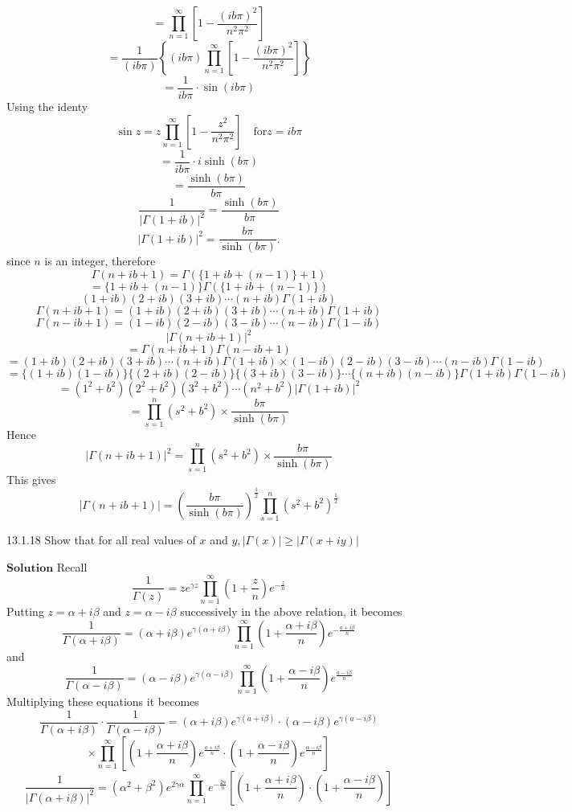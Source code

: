 \documentclass{article}
\begin{document}
\begin{flushleft}
$$
=\prod_{n=1}^{\infty}\left[1-\frac{(i b \pi)^{2}}{n^{2} \pi^{2}}\right]
$$
$$
=\frac{1}{(i b \pi)}\left\{(i b \pi) \prod_{n=1}^{\infty}\left[1-\frac{(i b \pi)^{2}}{n^{2} \pi^{2}}\right]\right\}
$$
$$
=\frac{1}{i b \pi} \cdot \sin (i b \pi)
$$
Using the identy
$$
\sin z=z \prod_{n=1}^{\infty}\left[1-\frac{z^{2}}{n^{2} \pi^{2}}\right] \quad \text{for} z=ib\pi
$$
$$=\frac{1}{i b \pi} \cdot i \sinh (b \pi)$$
$$=\frac{\sinh (b \pi)}{b \pi}$$
$$\frac{1}{|\Gamma(1+i b)|^{2}}=\frac{\sinh (b \pi)}{b \pi}$$
$$|\Gamma(1+i b)|^{2}=\frac{b \pi}{\sinh (b \pi)} .$$
since $n$ is an integer, therefore
$$\Gamma(n+i b+1)=\Gamma(\{1+i b+(n-1)\}+1)$$
$$=\{1+i b+(n-1)\} \Gamma(\{1+i b+(n-1)\})$$
$$
(1+i b)(2+i b)(3+i b) \cdots(n+i b) \Gamma(1+i b)
$$
$$
\Gamma(n+i b+1)=(1+i b)(2+i b)(3+i b) \cdots(n+i b) \Gamma(1+i b)
$$
$$
\Gamma(n-i b+1)=(1-i b)(2-i b)(3-i b) \cdots(n-i b) \Gamma(1-i b)
$$
$$|\Gamma(n+i b+1)|^{2}$$
$$=\Gamma(n+i b+1) \Gamma(n-i b+1)$$
$$=(1+i b)(2+i b)(3+i b) \cdots(n+i b) \Gamma(1+i b) \times(1-i b)(2-i b)(3-i b) \cdots(n-i b) \Gamma(1-i b)$$
$$=\{(1+i b)(1-i b)\}\{(2+i b)(2-i b)\}\{(3+i b)(3-i b)\} \cdots\{(n+i b)(n-i b)\} \Gamma(1+i b) \Gamma(1-i b)$$
$$=\left(1^{2}+b^{2}\right)\left(2^{2}+b^{2}\right)\left(3^{2}+b^{2}\right) \cdots\left(n^{2}+b^{2}\right)|\Gamma(1+i b)|^{2}$$
$$
=\prod_{s=1}^{n}\left(s^{2}+b^{2}\right) \times \frac{b \pi}{\sinh (b \pi)}
$$
Hence 
$$|\Gamma(n+i b+1)|^{2}=\prod_{s=1}^{n}\left(s^{2}+b^{2}\right) \times \frac{b \pi}{\sinh (b \pi)}$$
This gives 
$$|\Gamma(n+i b+1)|=\left(\frac{b \pi}{\sinh (b \pi)}\right)^{\frac{1}{2}} \prod_{s=1}^{n}\left(s^{2}+b^{2}\right)^{\frac{1}{2}} $$



\begin{mybox}{13.1.18}
Show that for all real values of $x$ and $y,|\Gamma(x)| \geq|\Gamma(x+i y)|$
\end{mybox}


$\boxed{\textbf{Solution}}$ Recall 
$$
\frac{1}{\Gamma(z)}=z e^{\gamma z} \prod_{n=1}^{\infty}\left(1+\frac{z}{n}\right) e^{-\frac{z}{n}}
$$
Putting $z=\alpha+i \beta$ and $z=\alpha-i \beta$ successively in the above relation, it becomes
$$
\frac{1}{\Gamma(\alpha+i \beta)}=(\alpha+i \beta) e^{\gamma(\alpha+i \beta)} \prod_{n=1}^{\infty}\left(1+\frac{\alpha+i \beta}{n}\right) e^{-\frac{a+i \beta}{n}}
$$
and 
$$
\frac{1}{\Gamma(\alpha-i \beta)}=(\alpha-i \beta) e^{\gamma(\alpha-i \beta)} \prod_{n=1}^{\infty}\left(1+\frac{\alpha-i \beta}{n}\right) e^{\frac{a-i \beta}{n}}
$$
Multiplying these equations it becomes
$$
\frac{1}{\Gamma(\alpha+i \beta)} \cdot \frac{1}{\Gamma(\alpha-i \beta)}=(\alpha+i \beta) e^{\gamma(a+i \beta)} \cdot(\alpha-i \beta) e^{\gamma(a-i \beta)}$$
$$\times \prod_{n=1}^{\infty}\left[\left(1+\frac{\alpha+i \beta}{n}\right) e^{\frac{a+i \beta}{n}} \cdot\left(1+\frac{\alpha-i \beta}{n}\right) e^{\frac{\alpha-i \beta}{n}}\right]
$$
$$
\frac{1}{|\Gamma(\alpha+i \beta)|^{2}}=\left(\alpha^{2}+\beta^{2}\right) e^{2\gamma \alpha} \prod_{n=1}^{\infty} e^{-\frac{2 a}{n}}\left[\left(1+\frac{\alpha+i \beta}{n}\right) \cdot\left(1+\frac{\alpha-i \beta}{n}\right)\right]
$$



\end{flushleft}
\end{document}
